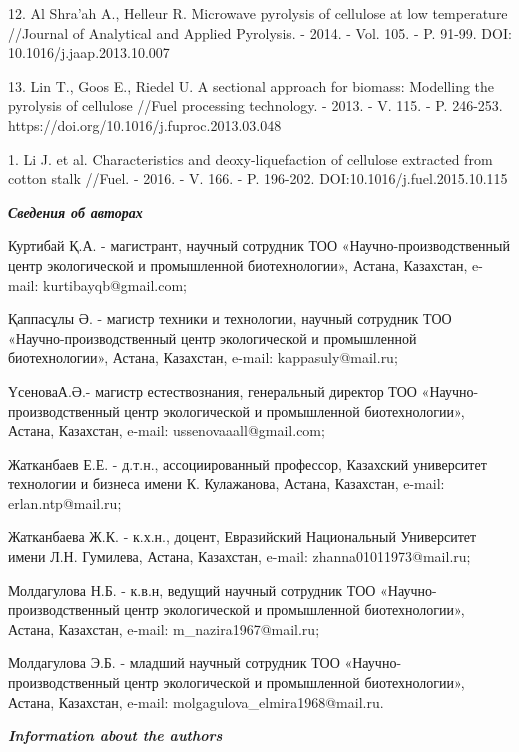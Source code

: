 \begin{noparindent}
12.
  Al Shra'ah A., Helleur R. Microwave pyrolysis of cellulose at low
  temperature //Journal of Analytical and Applied Pyrolysis. - 2014. -
  Vol. 105. - P. 91-99. DOI: 10.1016/j.jaap.2013.10.007

13.
  Lin T., Goos E., Riedel U. A sectional approach for biomass: Modelling
  the pyrolysis of cellulose //Fuel processing technology. - 2013. -
  V. 115. - P. 246-253. https://doi.org/10.1016/j.fuproc.2013.03.048

1.
  Li J. et al. Characteristics and deoxy-liquefaction of cellulose
  extracted from cotton stalk //Fuel. - 2016. - V. 166. - P. 196-202.
  DOI:10.1016/j.fuel.2015.10.115
\end{noparindent}

\emph{{\bfseries Сведения об авторах}}

\begin{noparindent}
Куртибай Қ.А. - магистрант, научный сотрудник ТОО
«Научно-производственный центр экологической и промышленной
биотехнологии», Астана, Казахстан, e-mail: kurtibayqb@gmail.com;

Қаппасұлы Ә. - магистр техники и технологии, научный сотрудник ТОО
«Научно-производственный центр экологической и промышленной
биотехнологии», Астана, Казахстан, e-mail: kappasuly@mail.ru;

ҮсеноваА.Ә.- магистр естествознания, генеральный директор ТОО
«Научно-производственный центр экологической и промышленной
биотехнологии», Астана, Казахстан, e-mail: ussenovaaall@gmail.com;

Жатканбаев Е.Е. - д.т.н., ассоциированный профессор, Казахский
университет технологии и бизнеса имени К. Кулажанова, Астана, Казахстан,
e-mail: erlan.ntp@mail.ru;

Жатканбаева Ж.К. - к.х.н., доцент, Евразийский Национальный Университет
имени Л.Н. Гумилева, Астана, Казахстан, e-mail: zhanna01011973@mail.ru;

Молдагулова Н.Б. - к.в.н, ведущий научный сотрудник ТОО
«Научно-производственный центр экологической и промышленной
биотехнологии», Астана, Казахстан, e-mail: m\_nazira1967@mail.ru;

Молдагулова Э.Б. - младший научный сотрудник ТОО
«Научно-производственный центр экологической и промышленной
биотехнологии», Астана, Казахстан, e-mail:
molgagulova\_elmira1968@mail.ru.
\end{noparindent}

\emph{{\bfseries Information about the authors}}

